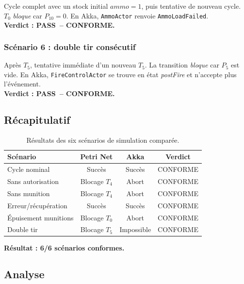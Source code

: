 \documentclass[11pt,a4paper]{article}
\newcommand{\code}[1]{\texttt{#1}}
\newcommand{\PASS}{\textcolor{green!50!black}{\textbf{PASS}}}
\begin{document}
Cycle complet avec un stock initial $\textit{ammo} = 1$, puis tentative de
nouveau cycle. $T_0$ \emph{bloque} car $P_{10}=0$. En Akka,
\code{AmmoActor} renvoie \code{AmmoLoadFailed}.\\
\textbf{Verdict : \PASS\ -- CONFORME.}

\subsubsection{Scénario 6 : double tir consécutif}

Après $T_5$, tentative immédiate d'un nouveau $T_5$. La transition
\emph{bloque} car $P_5$ est vide. En Akka, \code{FireControlActor} se
trouve en état \emph{postFire} et n'accepte plus l'événement.\\
\textbf{Verdict : \PASS\ -- CONFORME.}

\subsection{Récapitulatif}

\begin{table}[H]
\centering\small
\begin{tabular}{l c c c}
\toprule
\rowcolor{tableheader}\textbf{Scénario} & \textbf{Petri Net} & \textbf{Akka} & \textbf{Verdict} \\
\midrule
Cycle nominal           & Succès        & Succès        & CONFORME \\
Sans autorisation       & Blocage $T_4$ & Abort         & CONFORME \\
Sans munition           & Blocage $T_4$ & Abort         & CONFORME \\
Erreur/récupération     & Succès        & Succès        & CONFORME \\
Épuisement munitions    & Blocage $T_0$ & Abort         & CONFORME \\
Double tir              & Blocage $T_5$ & Impossible    & CONFORME \\
\bottomrule
\end{tabular}
\caption{Résultats des six scénarios de simulation comparée.}
\end{table}

\noindent
\textbf{Résultat : 6/6 scénarios conformes.}

\subsection{Analyse}
\end{document}
